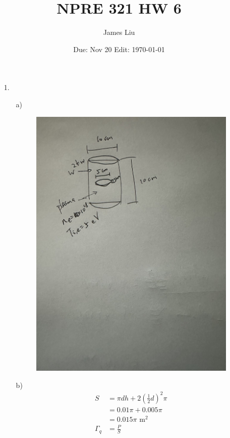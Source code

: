 \documentclass{article}
\date{Due: Nov 20 Edit: \today}
\title{NPRE 321 HW 6}
\author{James Liu}
\begin{document}
\maketitle
\begin{itemize}
    \item [1.]
    \begin{itemize}
        \item [a)] \
        \begin{figure}[h]
            \centering
            \includegraphics[scale = 0.2]{figure/npre321_HW6_fig1.jpeg}
        \end{figure}
        \item [b)]
        \begin{align*}
            S &= \pi d h + 2(\frac{1}{2}d)^2\pi\\
            &=0.01\pi+0.005\pi\\
            &=0.015\pi \text{ m}^2\\
            \Gamma_q &=\frac{P}{S}\\

\end{align*}
\end{itemize}
\end{itemize}
\end{document}
